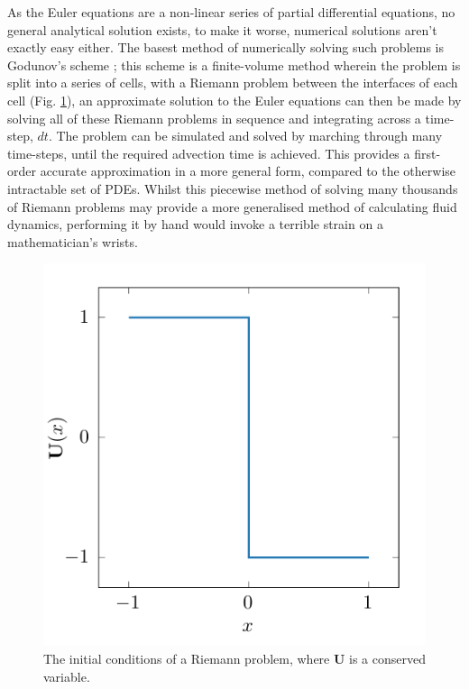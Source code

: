 \noindent
As the Euler equations are a non-linear series of partial differential equations, no general analytical solution exists, to make it worse, numerical solutions aren't exactly easy either.
The basest method of numerically solving such problems is Godunov's scheme \parencite{godunov_difference_1959}; this scheme is a finite-volume method wherein the problem is split into a series of cells, with a Riemann problem between the interfaces of each cell (Fig. \ref{fig:riemann}), an approximate solution to the Euler equations can then be made by solving all of these Riemann problems in sequence and integrating across a time-step, $dt$.
The problem can be simulated and solved by marching through many time-steps, until the required advection time is achieved.
This provides a first-order accurate approximation in a more general form, compared to the otherwise intractable set of PDEs. 
Whilst this piecewise method of solving many thousands of Riemann problems may provide a more generalised method of calculating fluid dynamics, performing it by hand would invoke a terrible strain on a mathematician's wrists.

\begin{figure}[ht]
  \centering
  \includegraphics[]{assets/riemann-interface/riemann.pdf}
  \caption[Initial conditions of a Riemann problem]{The initial conditions of a Riemann problem, where $\mathbf{U}$ is a conserved variable.}
  \label{fig:riemann}
\end{figure}

